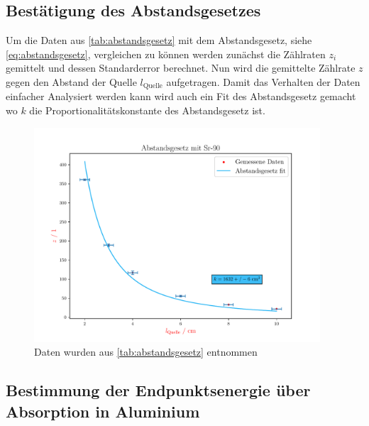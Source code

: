 \documentclass[12pt,english,ngerman]{scrartcl}
\begin{document}
\subsection{Bestätigung des Abstandsgesetzes}

Um die Daten aus \autoref{tab:abstandsgesetz} mit dem Abstandsgesetz, siehe
\autoref{eq:abstandsgesetz}, vergleichen zu können werden zunächst die
Zählraten $z_i$ gemittelt und dessen Standarderror berechnet. Nun wird die
gemittelte Zählrate $z$ gegen den Abstand der Quelle $l_{\mathrm{Quelle}}$
aufgetragen. Damit das Verhalten der Daten einfacher Analysiert werden kann
wird auch ein Fit des Abstandsgesetz gemacht wo $k$ die
Proportionalitätskonstante des Abstandsgesetz ist.

\begin{figure}[H]
  \begin{center}
    \includegraphics[width = 0.95\textwidth]{figures/abstandsgesetz.pdf}
  \end{center}
  \caption{Daten wurden aus \autoref{tab:abstandsgesetz} entnommen}
  \label{fig:abstandsgesetz}
\end{figure}


\subsection{Bestimmung der Endpunktsenergie über Absorption in Aluminium}
\end{document}
